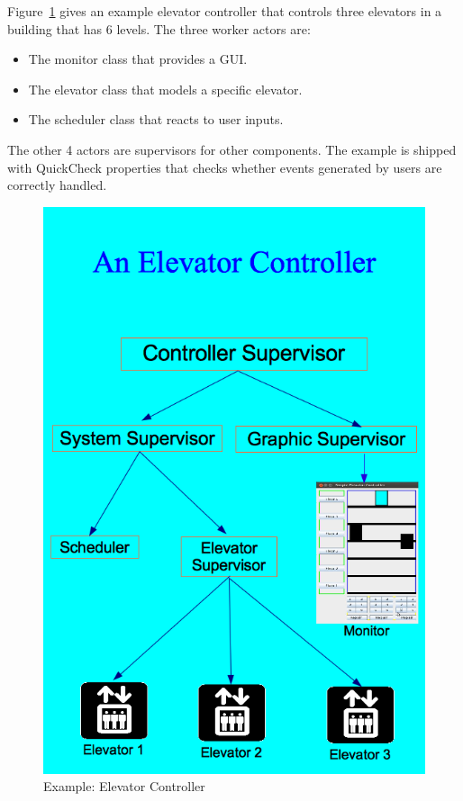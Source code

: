 Figure~\ref{elevator_controller} gives an example elevator controller that 
controls three elevators in a building that has 6 levels.  The three worker 
actors are:
\begin{itemize}
 \item The monitor class that provides a GUI.
 \item The elevator class that models a specific elevator.
 \item The scheduler class that reacts to user inputs.
\end{itemize}

The other 4 actors are supervisors for other components.  The example is 
shipped with QuickCheck properties that checks whether events generated by 
users are correctly handled.



\begin{figure}[p]
     \begin{center}
\includegraphics[keepaspectratio=true,height=0.6\paperheight]
{Pictures/ElevatorController.png}
    \end{center}
     \caption{Example:  Elevator Controller}
   \label{elevator_controller}   
\end{figure}

